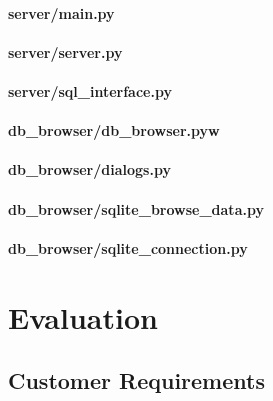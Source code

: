 \documentclass[12pt,a4paper]{report}
\begin{document}
        \subsubsection{server/main.py}
        \label{sec:main.py}
        

        \subsubsection{server/server.py}
        \label{sec:server.py}
        

        \subsubsection{server/sql\_interface.py}
        \label{sec:sqlinterface.py}
        

        \subsubsection{db\_browser/db\_browser.pyw}
        \label{sec:dbbrowser.py}
        

        \subsubsection{db\_browser/dialogs.py}
        \label{sec:dialogs.py}
        

        \subsubsection{db\_browser/sqlite\_browse\_data.py}
        \label{sec:browsedata.py}
        

        \subsubsection{db\_browser/sqlite\_connection.py}
        \label{sec:connection.py}
        

\chapter{Evaluation}

\section{Customer Requirements}
	
\end{document}
